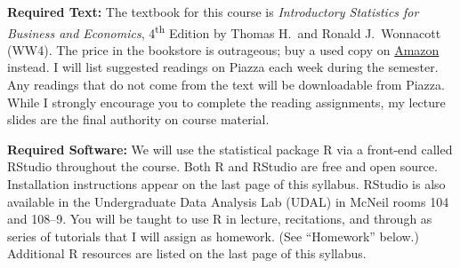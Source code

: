 \documentclass[11pt, letterpaper]{article}
\begin{document}
\medskip

\noindent \textbf{Required Text:} 
The textbook for this course is \emph{Introductory Statistics for Business and Economics}, 4\textsuperscript{th} Edition by Thomas H.\ and Ronald J.\ Wonnacott (WW4). 
The price in the bookstore is outrageous; buy a used copy on \href{http://tinyurl.com/ECON103-2013A}{Amazon} instead. 
I will list suggested readings on Piazza each week during the semester.
Any readings that do not come from the text will be downloadable from Piazza.
While I strongly encourage you to complete the reading assignments, my lecture slides are the final authority on course material.

\medskip


%


\noindent \textbf{Required Software:} 
We will use the statistical package R via a front-end called RStudio throughout the course. 
Both R and RStudio are free and open source. Installation instructions appear on the last page of this syllabus.
RStudio is also available in the Undergraduate Data Analysis Lab (UDAL) in McNeil rooms 104 and 108--9. 
You will be taught to use R in lecture, recitations, and through as series of tutorials that I will assign as homework. (See ``Homework'' below.)  
Additional R resources are listed on the last page of this syllabus.
\end{document}
